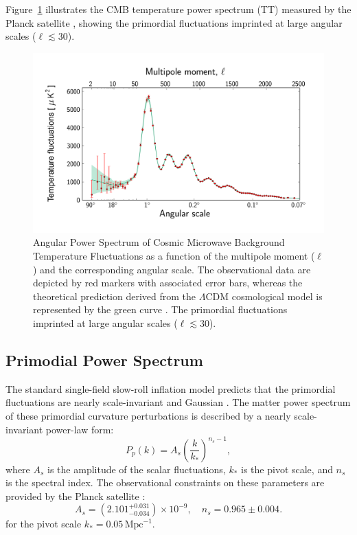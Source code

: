 Figure~\ref{fig:cmb_power_spectrum} illustrates the CMB temperature power spectrum (TT) measured by the Planck satellite \citep{2014A&A...571A..15P}, showing the primordial fluctuations imprinted at large angular scales (\( \ell \lesssim 30 \)).
\begin{figure}[ht]
    \centering
    \includegraphics[width=\textwidth]{figures/Planck_power_spectrum.jpg}
    \caption[Angular Power Spectrum (TT) of CMB Anisotropy]{Angular Power Spectrum of Cosmic Microwave Background Temperature Fluctuations as a function of the multipole moment (\( \ell \)) and the corresponding angular scale. The observational data are depicted by red markers with associated error bars, whereas the theoretical prediction derived from the \(\Lambda\)CDM cosmological model is represented by the green curve \citep{2014A&A...571A..15P}. The primordial fluctuations imprinted at large angular scales (\( \ell \lesssim 30 \)).
    }
    \label{fig:cmb_power_spectrum}
\end{figure}

\subsection{Primodial Power Spectrum}
The standard single-field slow-roll inflation model predicts that the primordial fluctuations are nearly scale-invariant and Gaussian \citep{2003moco.book.....D}. The matter power spectrum of these primordial curvature perturbations is described by a nearly scale-invariant power-law form:
\begin{equation}
    P_p(k) = A_s \left(\frac{k}{k_*}\right)^{n_s - 1},
\end{equation}
where $A_s$ is the amplitude of the scalar fluctuations, $k_*$ is the pivot scale, and $n_s$ is the spectral index. The observational constraints on these parameters are provided by the Planck satellite \citep{2020A&A...641A...6P}:
\begin{equation}
    A_s = (2.101^{+0.031}_{-0.034}) \times 10^{-9}, \quad n_s = 0.965 \pm 0.004.
\end{equation}
for the pivot scale \( k_* = 0.05 \, \text{Mpc}^{-1} \).

